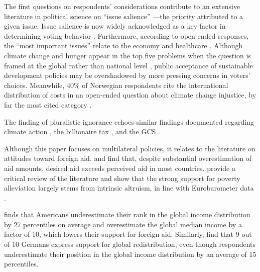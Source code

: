 \documentclass[12pt,english]{article}
\begin{document}
\begin{bibunit}
The first questions on respondents' considerations contribute to an extensive literature in political science on ``issue salience'' ---the priority attributed to a given issue. Issue salience is now widely acknowledged as a key factor in determining voting behavior \citep{repass_issue_1971,egan_partisan_2013,krosnick_role_1988,dennison_review_2019,edwards_explaining_1995}. Furthermore, according to open-ended responses, the ``most important issues'' relate to the economy and healthcare \citep{wlezien_salience_2005}. Although climate change and hunger appear in the top five problems when the question is framed at the global rather than national level \citep{yeager_measuring_2011}, public acceptance of sustainable development policies may be overshadowed by more pressing concerns in voters' choices. Meanwhile, 40\% of Norwegian respondents cite the international distribution of costs in an open-ended question about climate change injustice, by far the most cited category \citep{gregersen_poor_2025}. %

The finding of pluralistic ignorance echoes similar findings documented regarding %
climate action \citep{andre_misperceived_2024,andre_globally_2024,mildenberger_beliefs_2019}, the billionaire tax \citep{cappelen_majority_2025}, and the GCS \citep{fabre_majority_2025}. 

Although this paper focuses on multilateral policies, it relates to the literature on attitudes toward foreign aid. \cite{kaufmann_foreign_2019} and \cite{fabre_majority_2025} find that, despite substantial overestimation of aid amounts, desired aid exceeds perceived aid in most countries. \cite{hudson_mile_2012} provide a critical review of the literature and show that the strong support for poverty alleviation largely stems from intrinsic altruism, in line with Eurobarometer data \citep{cho_ideology_2024}. 

\cite{nair_misperceptions_2018} finds that Americans underestimate their rank in the global income distribution by 27 percentiles on average and overestimate the global median income by a factor of 10, which lowers their support for foreign aid. Similarly, \cite{fehr_your_2022} find that 9 out of 10 Germans express support for global redistribution, even though respondents underestimate their position in the global income distribution by an average of 15 percentiles. %


\end{bibunit}
\end{document}
